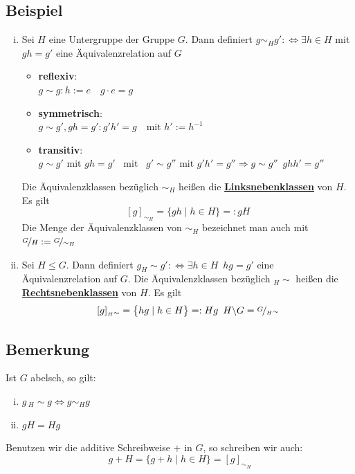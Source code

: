 \subsection{Beispiel} %
\label{sub:beispiel}
\begin{enumerate}[(i)]
	\item Sei $H$ eine Untergruppe der Gruppe $G$. Dann definiert $g \sim_H g' :\Leftrightarrow \exists h \in H$ mit $gh=g'$ 
	eine Äquivalenzrelation auf $G$ 
	\begin{itemize}
		\item \textbf{reflexiv}: \\ $g \sim g : h:= e \quad  g \cdot e = g$
		\item \textbf{symmetrisch}:  \\ $g \sim g' , gh=g' : g'h'=g \quad \text{mit } h':=h^{-1}$
		\item \textbf{transitiv}: \\ $g \sim g' \text{ mit } gh=g' \enspace \text{ mit } \enspace g' \sim g'' \text{ mit } g'h'=g'' \Rightarrow g \sim g'' \enspace ghh'=g''$
	\end{itemize}
	Die Äquivalenzklassen bezüglich $\sim_H$ heißen die \underline{\textbf{Linksnebenklassen}} von $H$. Es gilt
	\[
		[g]_{\sim_H} = \big\{ gh \mid h \in H \big\} =: gH
	\]
	Die Menge der Äquivalenzklassen von $\sim_H$ bezeichnet man auch mit $ \nicefrac{G}{H} := \nicefrac{G}{\sim_H}$
	\item Sei $H \le G$. Dann definiert $g _H{\sim} g' :\Leftrightarrow \exists h \in H \enspace hg=g'$ eine Äquivalenzrelation auf $G$.
	Die Äquivalenzklassen bezüglich $_H \! \sim$ heißen die \underline{\textbf{Rechtsnebenklassen}} von $H$. Es gilt
	\[
		[g]_{_H\sim} = \big\{ hg  \mid h \in H \big\} =: Hg \enspace H \backslash G = \nicefrac{G}{_H \sim}
	\]
\end{enumerate}

\subsection{Bemerkung} %
\label{sub:bemerkung}
Ist $G$ abelsch, so gilt:
\begin{enumerate}[(i)]
	\item $g \, { _H \! \sim} g \Leftrightarrow g \sim_H g$
	\item $gH = Hg$
\end{enumerate}
Benutzen wir die additive Schreibweise $+$ in $G$, so schreiben wir auch:
\[
	g+H = \big\{ g+h \mid h \in H \big\} = [g]_{\sim_H}
\]

